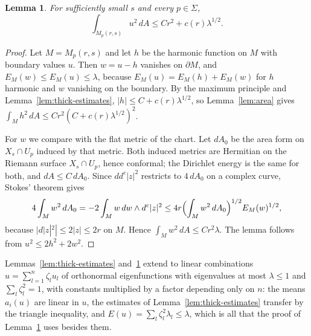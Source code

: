 \documentclass[11pt]{amsart}
\newtheorem{lemma}[theorem]{Lemma}
\theoremstyle{definition}
\theoremstyle{remark}
\newcommand{\dc}{d^c}
\begin{document}
\begin{lemma}\label{lem:milnor-mass}
For sufficiently small $s$ and every $p\in\Sigma$,
\[
 \int_{M_p(r,s)}u^2\,dA\le Cr^2+c(r)\lambda^{1/2}.
\]
\end{lemma}
\begin{proof}
Let $M=M_p(r,s)$ and let $h$ be the harmonic function on $M$ with
boundary values $u$. Then $w=u-h$ vanishes on $\partial M$, and
$E_M(w)\le E_M(u)\le\lambda$, because $E_M(u)=E_M(h)+E_M(w)$ for $h$
harmonic and $w$ vanishing on the boundary. By the maximum
principle and Lemma~\ref{lem:thick-estimates},
$|h|\le C+c(r)\lambda^{1/2}$, so Lemma~\ref{lem:area} gives
$\int_Mh^2\,dA\le Cr^2(C+c(r)\lambda^{1/2})^2$.

For $w$ we compare with the flat metric of the chart. Let $dA_0$ be the
area form on $X_s\cap U_p$ induced by that metric. Both induced metrics
are Hermitian on the Riemann surface $X_s\cap U_p$, hence conformal; the
Dirichlet energy is the same for both, and $dA\le C\,dA_0$. Since
$d\dc|z|^2$ restricts to $4\,dA_0$ on a complex curve, Stokes' theorem
gives
\[
 4\int_Mw^2\,dA_0=-2\int_Mw\,dw\wedge\dc|z|^2
 \le4r\Bigl(\int_Mw^2\,dA_0\Bigr)^{1/2}E_M(w)^{1/2},
\]
because $|d|z|^2|\le2|z|\le2r$ on $M$. Hence
$\int_Mw^2\,dA\le Cr^2\lambda$. The lemma follows from
$u^2\le2h^2+2w^2$.
\end{proof}

Lemmas~\ref{lem:thick-estimates} and~\ref{lem:milnor-mass} extend to
linear combinations $u=\sum_{l=1}^n\zeta_lu_l$ of orthonormal eigenfunctions
with eigenvalues at most $\lambda\le1$ and $\sum_l\zeta_l^2=1$, with constants
multiplied by a factor depending only on $n$: the means $a_i(u)$ are
linear in $u$, the estimates of Lemma~\ref{lem:thick-estimates} transfer
by the triangle inequality, and $E(u)=\sum_l\zeta_l^2\lambda_l\le\lambda$, which
is all that the proof of Lemma~\ref{lem:milnor-mass} uses besides them.
\end{document}

